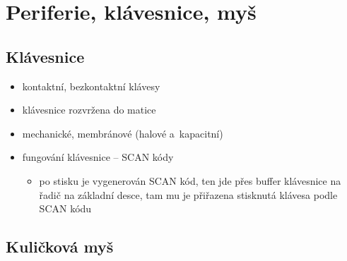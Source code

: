\documentclass[a4paper,12pt]{article}
\providecommand{\tightlist}{%
\setlength{\itemsep}{0pt}\setlength{\parskip}{0pt}}
\begin{document}
\section{Periferie, klávesnice, myš}

\subsection{Klávesnice}

\begin{itemize}
\tightlist
\item kontaktní, bezkontaktní klávesy
\item klávesnice rozvržena do matice
\item mechanické, membránové (halové a~kapacitní)
\item fungování klávesnice -- SCAN kódy

  \begin{itemize}
  \tightlist
  \item po stisku je vygenerován SCAN kód, ten jde přes buffer klávesnice na
    řadič na základní desce, tam mu je přiřazena stisknutá klávesa podle
    SCAN kódu
  \end{itemize}
\end{itemize}

\subsection{Kuličková myš}
\end{document}
